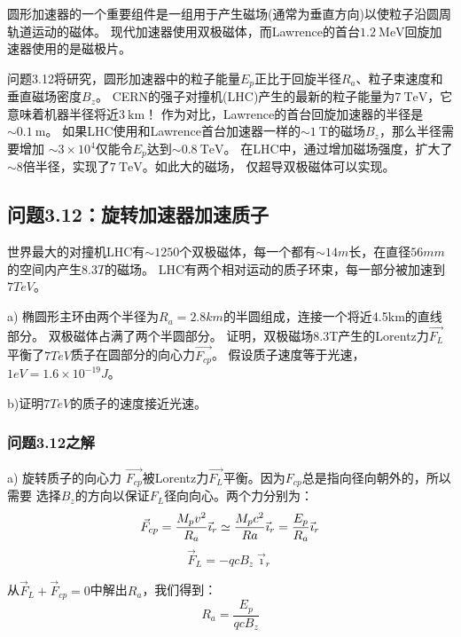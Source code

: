 圆形加速器的一个重要组件是一组用于产生磁场(通常为垂直方向)以使粒子沿圆周轨道运动的磁体。
现代加速器使用双极磁体，而Lawrence的首台$1.2\ \mathrm{MeV}$回旋加速器使用的是磁极片。

问题3.12将研究，圆形加速器中的粒子能量$E_p$正比于回旋半径$R_a$、粒子束速度和垂直磁场密度$B_z$。
CERN的强子对撞机(LHC)产生的最新的粒子能量为$7\ \mathrm{TeV}$，它意味着机器半径将近$3\ \mathrm{km}$！
作为对比，Lawrence的首台回旋加速器的半径是$\sim 0.1\ \mathrm{m}$。
如果LHC使用和Lawrence首台加速器一样的$\sim 1\ \mathrm{T}$的磁场$B_z$，那么半径需要增加
$\sim 3\times 10^4$仅能令$E_p$达到$\sim 0.8\ \mathrm{TeV}$。
在LHC中，通过增加磁场强度，扩大了$\sim 8$倍半径，实现了$7\ \mathrm{TeV}$。如此大的磁场，
仅超导双极磁体可以实现。
\newpage


\subsection{问题3.12：旋转加速器加速质子}
世界最大的对撞机LHC有$\sim 1250$个双极磁体，每一个都有$\sim 14 m$长，在直径$56 mm$的空间内产生$8.3T$的磁场。
LHC有两个相对运动的质子环束，每一部分被加速到$7 TeV$。

a) 椭圆形主环由两个半径为$R_a=2.8 km$的半圆组成，连接一个将近4.5km的直线部分。
双极磁体占满了两个半圆部分。
证明，双极磁场8.3T产生的Lorentz力$\vec{F_L}$平衡了$7 TeV$质子在圆部分的向心力$\vec{F_{cp}}$。
假设质子速度等于光速，$1 eV= 1.6\times 10^{−19} J$。

b)证明$7 TeV$的质子的速度接近光速。

\subsubsection{问题3.12之解}
a) 旋转质子的向心力 $\vec{F_{cp}}$被Lorentz力$\vec{F_L}$平衡。因为$F_{cp}$总是指向径向朝外的，所以需要
选择$B_z$的方向以保证$F_L$径向向心。两个力分别为：
\begin{equation}
\vec{F}_{cp}=\frac{M_{p}v^{2}}{R_{a}}\vec{\imath}_{r}\simeq\frac{M_{p}c^{2}}{Ra}\vec{\imath}_{r}=\frac{E_{p}}{R_{a}}\vec{\imath}_{r}\\%
\end{equation}
\begin{equation}
\vec{F}_{L}=-qcB_{z}\vec{\imath}_{r}%
\end{equation}

从$\vec{F}_{L}+\vec{F}_{cp}=0$中解出$R_a$，我们得到：
\begin{equation}
R_a=\frac{E_p}{q c B_z} %
\end{equation}


